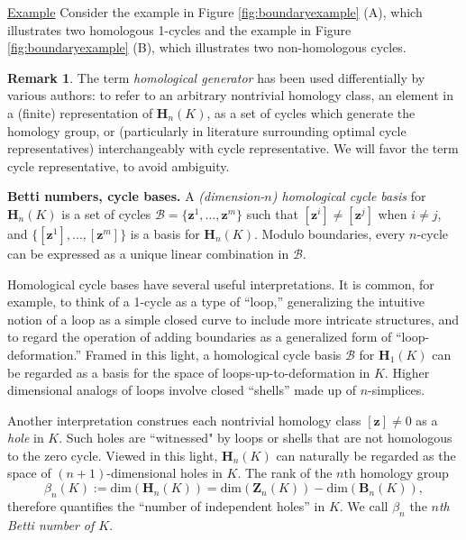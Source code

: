 \documentclass[utf8]{formatting_stuff/frontiersFPHY}
\newcommand{\Homologies}[0]{\mathbf{H}}
\newcommand{\Boundaries}[0]{\mathbf{B}}
\newcommand{\Cycles}[0]{\mathbf{Z}}
\newcommand{\cycle}{{\mathbf z}}
\newcommand{\hcyclebasis}{\mathcal B}
\theoremstyle{plain}
\theoremstyle{definition}
\newtheorem{remark}[theorem]{Remark}
\begin{document}
\noindent \underline{Example} Consider the example in Figure \ref{fig:boundaryexample} (A), which illustrates two homologous 1-cycles and the example in Figure \ref{fig:boundaryexample} (B), which illustrates two non-homologous cycles. 
 

\begin{remark}
The term \emph{homological generator} has been used differentially by various authors: to refer to an arbitrary nontrivial homology class, an element in a (finite) representation of $\Homologies_n(K)$, as a set of cycles which generate the homology group, or (particularly in literature surrounding optimal cycle representatives)  interchangeably with cycle representative. We will  favor the term cycle representative, to avoid ambiguity.
\end{remark}




\noindent \textbf{Betti numbers, cycle bases.}  A \emph{(dimension-$n$) homological cycle basis} for $\Homologies_n(K)$ is a set of cycles $\hcyclebasis = \{ \cycle^1 , \ldots, \cycle^m\}$ such that $[\cycle^i] \neq [\cycle^j]$ when $i \neq j$, and $\{ [\cycle^1] , \ldots, [\cycle^m]\}$ is a  basis for $\Homologies_n(K)$.  Modulo boundaries, every $n$-cycle can be expressed as a unique linear combination in $\hcyclebasis$.  

Homological cycle bases have several useful interpretations.  It is common, for example, to think of a 1-cycle as a type of ``loop,'' generalizing the intuitive notion of a loop as a simple closed curve to include more intricate structures, and to regard the operation of adding boundaries as a generalized form of ``loop-deformation.''  Framed in this light, a homological cycle basis $\hcyclebasis$ for $\Homologies_1(K)$ can be regarded as a basis for the space of loops-up-to-deformation in $K$. Higher dimensional analogs of loops involve closed ``shells'' made up of $n$-simplices.

Another interpretation construes each nontrivial homology class $[\cycle] \neq 0$ as a \emph{hole} in $K$. Such holes are ``witnessed" by loops or shells that are not homologous to the zero cycle. Viewed in this light, $\Homologies_n(K)$ can naturally be regarded as the space of $(n+1)$-dimensional holes in $K$.  The rank of the $n$th homology group
    \[
    \beta_n(K) := \text{dim}(\Homologies_n(K)) = \text{dim}(\Cycles_n(K)) - \text{dim}(\Boundaries_n(K)),
    \]
therefore quantifies the ``number of independent holes'' in $K$.  We call $\beta_n$ the \emph{$n$th Betti number of $K$}.  
 
\end{document}
